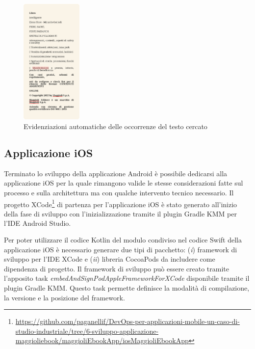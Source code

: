 \begin{multicols}{3}
            \begin{figure}[H]
                \centering
                \includegraphics[width=0.27\textwidth]{img/ricerca_testo2.png}
                \caption{Evidenziazioni automatiche delle occorrenze del testo cercato}
                \label{ricerca_testo2-android}
            \end{figure}
\end{multicols}

\subsection{Applicazione iOS}
Terminato lo sviluppo della applicazione Android è possibile dedicarsi alla applicazione iOS per la quale rimangono valide le stesse considerazioni fatte sul processo e sulla architettura ma con qualche intervento tecnico necessario. Il progetto XCode\footnote{\href{https://github.com/paganellif/DevOps-per-applicazioni-mobile-un-caso-di-studio-industriale/tree/6-sviluppo-applicazione-maggioliebook/maggioliEbookApp/iosMaggioliEbookApp}{https://github.com/paganellif/DevOps-per-applicazioni-mobile-un-caso-di-studio-industriale/tree/6-sviluppo-applicazione-maggioliebook/maggioliEbookApp/iosMaggioliEbookApp}} di partenza per l'applicazione iOS è stato generato all'inizio della fase di sviluppo con l'inizializzazione tramite il plugin Gradle KMM per l'IDE Android Studio.

Per poter utilizzare il codice Kotlin del modulo condiviso nel codice Swift della applicazione iOS è necessario generare due tipi di pacchetto: (\textit{i}) framework di sviluppo per l'IDE XCode e (\textit{ii}) libreria CocoaPods da includere come dipendenza di progetto. Il framework di sviluppo può essere creato tramite l'apposito task \textit{embedAndSignPodAppleFrameworkForXCode} disponibile tramite il plugin Gradle KMM. Questo task permette definisce la modalità di compilazione, la versione e la posizione del framework.

